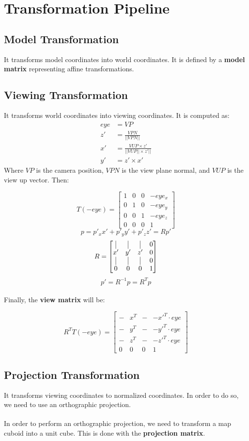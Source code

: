 \documentclass{article}
\begin{document}
\section{Transformation Pipeline}
\subsection{Model Transformation}
It transforms model coordinates into world coordinates. It is defined by a \textbf{model matrix} representing affine transformations.

\subsection{Viewing Transformation}
It transforms world coordinates into viewing coordinates. It is computed as:
\begin{align*}
	eye &= VP \\
	z' &= \frac{VPN}{||VPN||} \\
	x' &= \frac{VUP \times z'}{||VUP|| \times z'||} \\
	y' &= z' \times x'
\end{align*}
Where $VP$ is the camera position, $VPN$ is the view plane normal, and $VUP$ is the view up vector. Then:

\[ T(-eye) = \begin{bmatrix} 1 & 0 & 0 & -eye_x \\ 0 & 1 & 0 & -eye_y \\ 0 & 0 & 1 & -eye_z \\ 0 & 0 & 0 & 1 \end{bmatrix} \]
\[ p = p'_xx' + p'_yy' + p'_zz' = Rp' \]
\[ R = \begin{bmatrix} \vline & \vline & \vline & 0 \\ x' & y' & z' & 0 \\ \vline & \vline & \vline & 0 \\ 0 & 0 & 0 & 1 \end{bmatrix} \]
\[ p' = R^{-1}p = R^Tp \] \\
Finally, the \textbf{view matrix} will be:

\[ R^TT(-eye) = \begin{bmatrix} - & x^T & - & -x'^T \cdot eye \\ - & y^T & - & -y'^T \cdot eye \\ - & z^T & - & -z'^T \cdot eye \\ 0 & 0 & 0 & 1 \end{bmatrix} \]

\subsection{Projection Transformation}
It transforms viewing coordinates to normalized coordinates. In order to do so, we need to use an orthographic projection. \\ \\
In order to perform an orthographic projection, we need to transform a map cuboid into a unit cube. This is done with the \textbf{projection matrix}.
\end{document}

